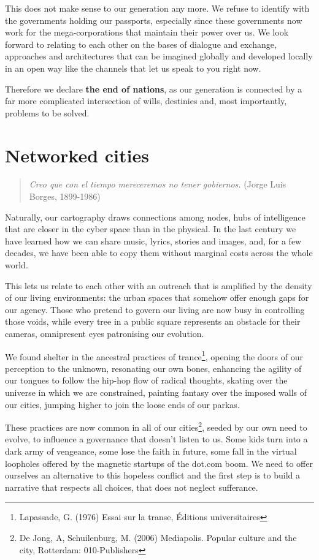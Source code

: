 This does not make sense to our generation any more. We refuse to identify with
the governments holding our passports, especially since these governments now
work for the mega-corporations that maintain their power over us. We look
forward to relating to each other on the bases of dialogue and exchange,
approaches and architectures that can be imagined globally and developed locally
in an open way like the channels that let us speak to you right now.

Therefore we declare \textbf{the end of nations}, as our generation is connected
by a far more complicated intersection of wills, destinies and, most
importantly, problems to be solved.


\section{Networked cities}
\label{s:weaver_birds:networked_cities}

\begin{quote}
\textit{Creo que con el tiempo mereceremos no tener gobiernos.} (Jorge Luis
Borges, 1899-1986)
\end{quote}

Naturally, our cartography draws connections among nodes, hubs of intelligence
that are closer in the cyber space than in the physical. In the last century we
have learned how we can share music, lyrics, stories and images, and, for a few
decades, we have been able to copy them without marginal costs across the whole
world.

This lets us relate to each other with an outreach that is amplif\hbox{}ied by
the density of our living environments: the urban spaces that somehow
of\hbox{}fer enough gaps for our agency. Those who pretend to govern our living
are now busy in controlling those voids, while every tree in a public square
represents an obstacle for their cameras, omnipresent eyes patronising our
evolution.

We found shelter in the ancestral practices of trance\footnote{Lapassade, G.
(1976) Essai sur la transe, Éditions universitaires}, opening the doors of our
perception to the unknown, resonating our own bones, enhancing the agility of
our tongues to follow the hip-hop f\hbox{}low of radical thoughts, skating over
the universe in which we are constrained, painting fantasy over the imposed
walls of our cities, jumping higher to join the loose ends of our parkas.

These practices are now common in all of our cities\footnote{De Jong, A,
Schuilenburg, M. (2006) Mediapolis. Popular culture and the city, Rotterdam:
010-Publishers}, seeded by our own need to evolve, to inf\hbox{}luence a
governance that doesn't listen to us. Some kids turn into a dark army of
vengeance, some lose the faith in future, some fall in the virtual loopholes
of\hbox{}fered by the magnetic startups of the dot.com boom. We need to
of\hbox{}fer ourselves an alternative to this hopeless conf\hbox{}lict and the
f\hbox{}irst step is to build a narrative that respects all choices, that does
not neglect suf\hbox{}ferance.

